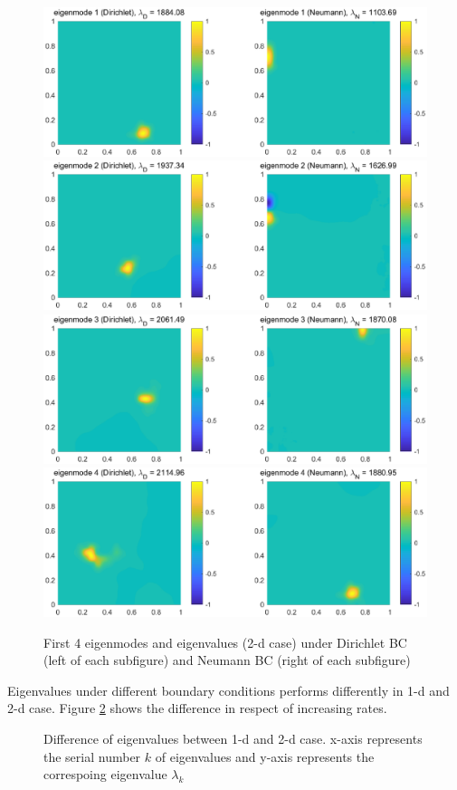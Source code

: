 \documentclass[12pt,a4paper]{article}
\begin{document}
\begin{figure}[h]
\centering
\includegraphics[width=0.45\linewidth]{F5E1}
\includegraphics[width=0.45\linewidth]{F5E2}
\includegraphics[width=0.45\linewidth]{F5E3}
\includegraphics[width=0.45\linewidth]{F5E4}
\caption{First 4 eigenmodes and eigenvalues (2-d case) under Dirichlet BC (left of each subfigure) and Neumann BC (right of each subfigure)}
\label{fig:5}
\end{figure}

Eigenvalues under different boundary conditions performs differently in 1-d and 2-d case. Figure \ref{fig:45} shows the difference in respect of increasing rates.
\begin{figure}[h]
\centering
{}
\caption{Difference of eigenvalues between 1-d and 2-d case. x-axis represents the serial number $k$ of eigenvalues and y-axis represents the correspoing eigenvalue $\lambda_k$}
\label{fig:45}
\end{figure}
\end{document}

